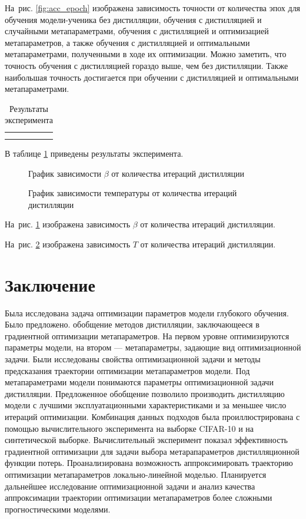 \documentclass[12pt, twoside]{article}
\begin{document}
На~рис. \ref{fig:acc_epoch} изображена зависимость точности от количества эпох для обучения модели-ученика без дистилляции, обучения с дистилляцией и случайными метапараметрами, обучения с дистилляцией и оптимизацией метапараметров, а также обучения с дистилляцией и оптимальными метапараметрами, полученными в ходе их оптимизации. Можно заметить, что точность обучения с дистилляцией гораздо выше, чем без дистилляции. Также наибольшая точность достигается при обучении с дистилляцией и оптимальными метапараметрами.

\begin{table}[h]
    \centering
    \begin{tabular}{c|c}
         &  \\
         & 
    \end{tabular}
    \caption{Результаты эксперимента}
    \label{tab:experiment_results}
\end{table}

В таблице \ref{tab:experiment_results} приведены результаты эксперимента.

\begin{figure}[h]
    \centering
    \caption{График зависимости $\beta$ от количества итераций дистилляции}
    \label{fig:iter_beta}
\end{figure}

\begin{figure}[h]
    \centering
    \caption{График зависимости температуры от количества итераций дистилляции}
    \label{fig:iter_temp}
\end{figure}

На~рис. \ref{fig:iter_beta} изображена зависимость $\beta$ от количества итераций дистилляции.

На~рис. \ref{fig:iter_temp} изображена зависимость $T$ от количества итераций дистилляции.

\section{Заключение}

Была исследована задача оптимизации параметров модели глубокого обучения. Было предложено. обобщение методов дистилляции, заключающееся в градиентной оптимизации метапараметров. На первом уровне оптимизируются параметры модели, на втором --- метапараметры, задающие вид оптимизационной задачи. Были исследованы свойства оптимизационной задачи и методы предсказания траектории оптимизации метапараметров модели. Под метапараметрами модели понимаются параметры оптимизационной задачи дистилляции. Предложенное обобщение позволило производить дистилляцию модели с лучшими эксплуатационными характеристиками и за меньшее число итераций оптимизации. Комбинация данных подходов была проиллюстрирована с помощью вычислительного эксперимента на выборке CIFAR-10 и на синтетической выборке. Вычислительный эксперимент показал эффективность градиентной оптимизации для задачи выбора метарапараметров дистилляционной функции потерь. Проанализирована возможность аппроксимировать траекторию оптимизации метапараметров локально-линейной моделью. Планируется дальнейшее исследование оптимизационной задачи и анализ качества  аппроксимации траектории оптимизации метапараметров более сложными прогностическими моделями.
\end{document}
